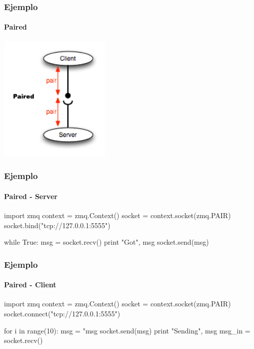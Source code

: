 \begin{frame}
    \begin{center}
        \vspace{1cm}
            \Huge {}\\
            \Large {}
    \end{center}
\end{frame}

\begin{frame}
    \frametitle{Ejemplo}
    \framesubtitle{Paired}
    \begin{center}
        \includegraphics[width=0.4\textwidth]{img/paired}
    \end{center}
\end{frame}

\begin{frame}[fragile]
    \frametitle{Ejemplo}
    \framesubtitle{Paired - Server}

    \begin{python}
        import zmq
        context = zmq.Context()
        socket = context.socket(zmq.PAIR)
        socket.bind("tcp://127.0.0.1:5555")
        
        while True:
            msg = socket.recv()
            print "Got", msg
            socket.send(msg)
    \end{python}

\end{frame}


\begin{frame}[fragile]
    \frametitle{Ejemplo}
    \framesubtitle{Paired - Client}

    \begin{python}
        import zmq
        context = zmq.Context()
        socket = context.socket(zmq.PAIR)
        socket.connect("tcp://127.0.0.1:5555")
        
        for i in range(10):
            msg = "msg %
            socket.send(msg)
            print "Sending", msg
            msg_in = socket.recv()
    \end{python}

\end{frame}



